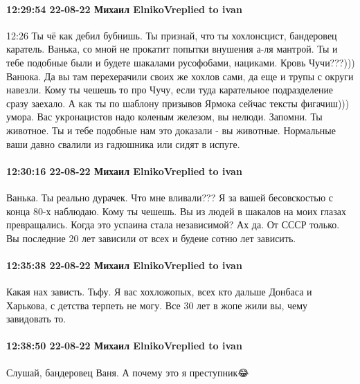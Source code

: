  
 
 
 
 

\paragraph{12:29:54 22-08-22 Михаил ElnikoVreplied to ivan}

12:26
Ты чё как дебил бубнишь. Ты признай, что ты хохлонсцист, бандеровец каратель. Ванька, со мной не прокатит попытки внушения а-ля мантрой.
Ты и тебе подобные были и будете шакалами русофобами, нациками.
Кровь Чучи???))) Ванюка. Да вы там перехерачили своих же хохлов сами, да еще и трупы с округи навезли. Кому ты чешешь то про Чучу, если туда карательное подразделение сразу заехало.
А как ты по шаблону призывов Ярмока сейчас тексты фигачиш))) умора.
Вас укронацистов надо коленым железом, вы нелюди. Запомни. Ты животное. Ты и тебе подобные нам это доказали - вы животные. Нормальные ваши давно свалили из гадюшника или сидят в испуге.

\paragraph{12:30:16 22-08-22 Михаил ElnikoVreplied to ivan}

Ванька. Ты реально дурачек. Что мне вливали??? Я за вашей бесовскостью с конца 80-х наблюдаю. Кому ты чешешь. Вы из людей в шакалов на моих глазах превращались. Когда это успаина стала независимой? Ах да. От СССР только. Вы последние 20 лет зависили от всех и будеие сотню лет зависить.

\paragraph{12:35:38 22-08-22 Михаил ElnikoVreplied to ivan}

Какая нах зависть. Тьфу. Я вас хохложопых, всех кто дальше Донбаса и Харькова, с детства терпеть не могу. Все 30 лет в жопе жили вы, чему завидовать то.

\paragraph{12:38:50 22-08-22 Михаил ElnikoVreplied to ivan}

Слушай, бандеровец Ваня. А почему это я преступник😂
